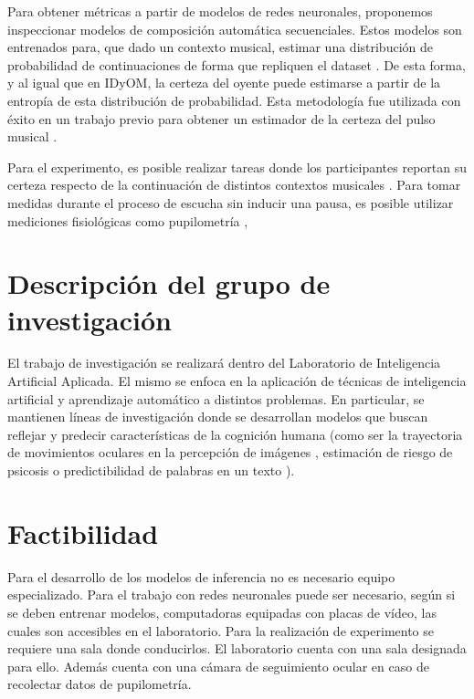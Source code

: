 \documentclass[a4paper,11pt]{article}
\begin{document}
Para obtener métricas a partir de modelos de redes neuronales, proponemos
inspeccionar modelos de composición automática secuenciales. Estos modelos
son entrenados para, que dado un contexto musical, estimar una distribución de
probabilidad de continuaciones de forma que repliquen el dataset
\cite{huang2018music}. De esta forma, y al igual que en IDyOM, la certeza del
oyente puede estimarse a partir de la entropía de esta distribución de
probabilidad. Esta metodología fue utilizada con éxito en un trabajo previo
para obtener un estimador de la certeza del pulso musical
\cite{pironio2021clarity}.

Para el experimento, es posible realizar tareas donde los participantes
reportan su certeza respecto de la continuación de distintos contextos
musicales \cite{hansen2014uncertainty}. Para tomar medidas durante el proceso
de escucha sin inducir una pausa, es posible utilizar mediciones fisiológicas
como pupilometría \cite{zhang2020using}, 

\section*{Descripción del grupo de investigación}

El trabajo de investigación se realizará dentro del Laboratorio de Inteligencia
Artificial Aplicada. El mismo se enfoca en la aplicación de técnicas de
inteligencia artificial y aprendizaje automático a distintos problemas. En
particular, se mantienen líneas de investigación donde se desarrollan modelos
que buscan reflejar y predecir características de la cognición humana (como ser
la trayectoria de movimientos oculares en la percepción de imágenes
\cite{bujia2022modeling}, estimación de riesgo de psicosis
\cite{bedi2015psychosis} o predictibilidad de palabras en un texto
\cite{bianchi2020predictability}).

\section*{Factibilidad}

Para el desarrollo de los modelos de inferencia no es necesario equipo
especializado. Para el trabajo con redes neuronales puede ser necesario, según
si se deben entrenar modelos, computadoras equipadas con placas de vídeo, las
cuales son accesibles en el laboratorio. Para la realización de experimento se
requiere una sala donde conducirlos. El laboratorio cuenta con una sala
designada para ello. Además cuenta con una cámara de seguimiento ocular en
caso de recolectar datos de pupilometría.
\end{document}
